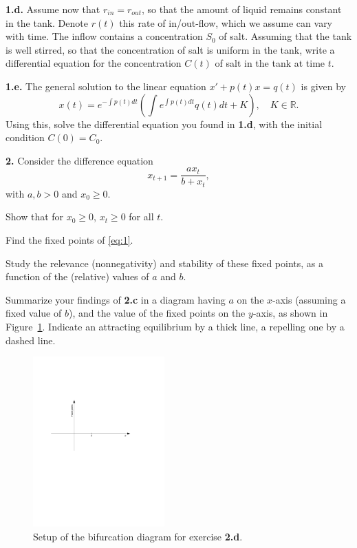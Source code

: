\documentclass[12pt]{article}
\theoremstyle{plain}
\begin{document}
\noindent
{\bf 1.d.} Assume now that $r_{in}=r_{out}$, so that the amount of liquid remains constant in the tank. Denote $r(t)$ this rate of in/out-flow, which we assume can vary with time. The inflow contains a concentration $S_0$ of salt. Assuming that the tank is well stirred, so that the concentration of salt is uniform in the tank, write a differential equation for the concentration $C(t)$ of salt in the tank at time $t$.

\noindent
{\bf 1.e.}
The general solution to the linear equation $x'+p(t)x=q(t)$ is given by 
\[
x(t)=e^{-\int p(t)dt}\left(\int e^{\int p(t)dt}q(t)dt+K\right),\quad K\in\mathbb{R}.
\]
Using this, solve the differential equation you found in {\bf 1.d}, with the initial condition $C(0)=C_0$.

\vskip1cm
\noindent
{\bf 2.} Consider the difference equation
\begin{equation}\label{eq:1}
x_{t+1}=\frac{ax_t}{b+x_t},
\end{equation}
with $a,b>0$ and $x_0\geq 0$.

 Show that for $x_0\geq 0$, $x_t\geq 0$ for all $t$.

 Find the fixed points of \eqref{eq:1}. 

 Study the relevance (nonnegativity) and stability of these fixed points, as a function of the (relative) values of $a$ and $b$.

 Summarize your findings of {\bf 2.c} in a diagram having $a$ on the $x$-axis (assuming a fixed value of $b$), and the value of the fixed points on the $y$-axis, as shown in Figure~\ref{fig:2}. Indicate an attracting equilibrium by a thick line, a repelling one by a dashed line.
\begin{figure}[htbp]
\begin{center}
\includegraphics[width=0.45\textwidth]{fig2_midterm2007}
\caption{Setup of the bifurcation diagram for exercise {\bf 2.d}.}
\label{fig:2}
\end{center}
\end{figure}
\end{document}
